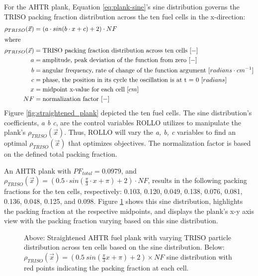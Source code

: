For the \gls{AHTR} plank, Equation \ref{eq:plank-sine}'s sine distribution governs 
the \gls{TRISO} packing fraction distribution across the ten fuel cells in the 
x-direction:
\begin{align}
    \label{eq:plank-sine}
    \rho_{TRISO}(\vec{x}) &= \left(a\cdot sin(b\cdot x + c) + 2\right) \cdot NF\\
    \intertext{where}
    \rho_{TRISO}(\vec{x}) &= \mbox{TRISO packing fraction distribution across ten cells } [-] \nonumber \\ 
    a &= \mbox{amplitude, peak deviation of the function from zero } [-] \nonumber \\
    b &= \mbox{angular frequency, rate of change of the function argument } [radians \cdot cm^{-1}] \nonumber \\
    c &= \mbox{phase, the position in its cycle the oscillation is at t = 0 } [radians]\nonumber \\
    x &= \mbox{midpoint x-value for each cell } [cm]\nonumber \\
    NF &= \mbox{normalization factor } [-]\nonumber
\end{align}
Figure \ref{fig:straightened_plank} depicted the ten fuel cells.
The sine distribution's coefficients, \textit{a b c}, are the control variables 
\gls{ROLLO} utilizes to manipulate the plank's $\rho_{TRISO}(\vec{x})$.
Thus, \gls{ROLLO} will vary the \textit{a, b, c} variables to find an optimal 
$\rho_{TRISO}(\vec{x})$ that optimizes objectives. 
The normalization factor is based on the defined total packing fraction.

An \gls{AHTR} plank with $PF_{total} = 0.0979$, and 
$\rho_{TRISO}(\vec{x}) = \left(0.5\cdot sin(\frac{\pi}{3}\cdot x + \pi) + 2\right) 
\cdot NF$, results in the following packing fractions for the ten cells, respectively: 
0.103, 0.120, 0.049, 0.138, 0.076, 0.081, 0.136, 0.048, 0.125, and 0.098. 
Figure \ref{fig:triso_distribution} shows this sine distribution, highlights 
the packing fraction at the respective midpoints, and displays the plank's x-y 
axis view with the packing fraction varying based on this sine distribution. 
\begin{figure}[htbp]
    \centering
    \caption{Above: Straightened \acrfull{AHTR} fuel plank with varying \gls{TRISO} 
    particle distribution across ten cells based on the sine distribution. 
    Below: $\rho_{TRISO}(\vec{x}) = (0.5\ sin(\frac{\pi}{3}x + \pi) + 2)  \times NF$ 
    sine distribution with red points indicating the packing fraction at each cell.}
    \label{fig:triso_distribution}
\end{figure}


